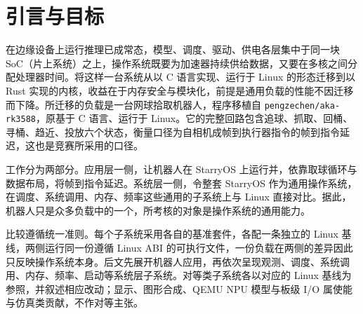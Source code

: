 \section{引言与目标}

在边缘设备上运行推理已成常态，模型、调度、驱动、供电各层集中于同一块 SoC（片上系统）之上，操作系统既要为加速器持续供给数据，又要在多核之间分配处理器时间。将这样一台系统从以 C 语言实现、运行于 Linux 的形态迁移到以 Rust 实现的内核，收益在于内存安全与模块化，前提是通用负载的性能不因迁移而下降。所迁移的负载是一台网球拾取机器人，程序移植自 \texttt{pengzechen/\allowbreak aka-rk3588}，原基于 C 语言、运行于 Linux。它的完整回路包含追球、抓取、回桶、寻桶、趋近、投放六个状态，衡量口径为自相机成帧到执行器指令的帧到指令延迟，这也是竞赛所采用的口径。

工作分为两部分。应用层一侧，让机器人在 StarryOS 上运行并，依靠取球循环与数据布局，将帧到指令延迟。系统层一侧，令整套 StarryOS 作为通用操作系统，在调度、系统调用、内存、频率这些通用的子系统上与 Linux 直接对比。据此，机器人只是众多负载中的一个，所考核的对象是操作系统的通用能力。

比较遵循统一准则。每个子系统采用各自的基准套件，各配一条独立的 Linux 基线，两侧运行同一份遵循 Linux ABI 的可执行文件，一份负载在两侧的差异因此只反映操作系统本身。后文先展开机器人应用，再依次呈现观测、调度、系统调用、内存、频率、启动等系统层子系统。对等类子系统各以对应的 Linux 基线为参照，并叙述相应改动；显示、图形合成、QEMU NPU 模型与板级 I/O 属使能与仿真类贡献，不作对等主张。
